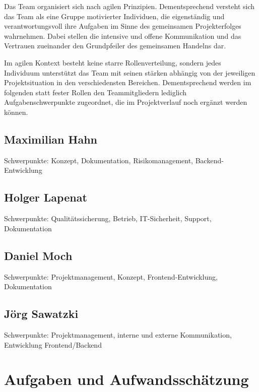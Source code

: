 \documentclass[a4paper,11pt,listof=numbered,glossary=totoc,parskip=half,toc=bib]{scrreprt}
\begin{document}
Das Team organisiert sich nach agilen Prinzipien. Dementsprechend versteht sich das Team als eine Gruppe motivierter Individuen, die eigenständig und verantwortungsvoll ihre Aufgaben im Sinne des gemeinsamen Projekterfolges wahrnehmen. Dabei stellen die intensive und offene Kommunikation und das Vertrauen zueinander den Grundpfeiler des gemeinsamen Handelns dar.

Im agilen Kontext besteht keine starre Rollenverteilung, sondern jedes Individuum unterstützt das Team mit seinen stärken abhängig von der jeweiligen Projektsituation in den verschiedensten Bereichen.
Dementsprechend werden im folgenden statt fester Rollen den Teammitgliedern lediglich Aufgabenschwerpunkte zugeordnet, die im Projektverlauf noch ergänzt werden können.

\subsection{Maximilian Hahn}

Schwerpunkte: Konzept, Dokumentation, Risikomanagement, Backend-Entwicklung

\subsection{Holger Lapenat}

Schwerpunkte: Qualitätssicherung, Betrieb, IT-Sicherheit, Support, Dokumentation

\subsection{Daniel Moch}

Schwerpunkte: Projektmanagement, Konzept, Frontend-Entwicklung, Dokumentation

\subsection{Jörg Sawatzki}

Schwerpunkte: Projektmanagement, interne und externe Kommunikation, Entwicklung Frontend/Backend


	
	\newpage
	\section{Aufgaben und Aufwandsschätzung}
	
\end{document}
